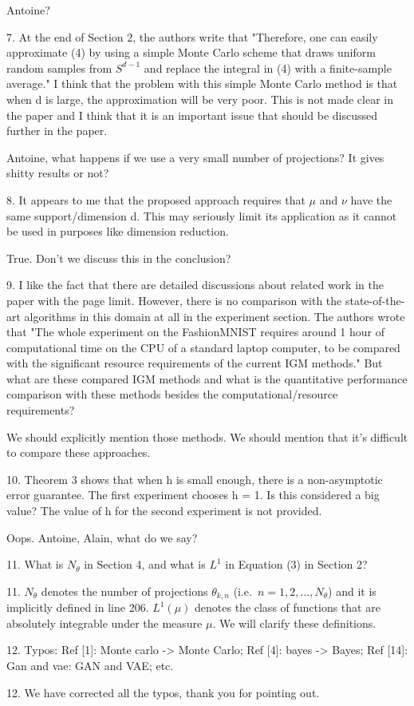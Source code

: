 \documentclass{article}
\newcommand{\rev}[1]{{\color{red} #1}}
\newcommand{\umut}[1]{{\color{blue} #1}}
\begin{document}
\umut{Antoine?}

\rev{7. At the end of Section 2, the authors write that "Therefore, one can easily approximate (4) by using a simple Monte Carlo scheme that draws uniform random samples from $S^{d-1}$ and replace the integral in (4) with a finite-sample average." I think that the problem with this simple Monte Carlo method is that when d is large, the approximation will be very poor. This is not made clear in the paper and I think that it is an important issue that should be discussed further in the paper.} 

\umut{Antoine, what happens if we use a very small number of projections? It gives shitty results or not?}

\rev{8. It appears to me that the proposed approach requires that $\mu$ and $\nu$ have the same support/dimension d. This may seriously limit its application as it cannot be used in purposes like dimension reduction.} 

\umut{True. Don't we discuss this in the conclusion?}

\rev{9. I like the fact that there are detailed discussions about related work in the paper with the page limit. However, there is no comparison with the state-of-the-art algorithms in this domain at all in the experiment section. The authors wrote that "The whole experiment on the FashionMNIST requires around 1 hour of computational time on the CPU of a standard laptop computer, to be compared with the significant resource requirements of the current IGM methods." But what are these compared IGM methods and what is the quantitative performance comparison with these methods besides the computational/resource requirements?} 

\umut{We should explicitly mention those methods. We should mention that it's difficult to compare these approaches.}

\rev{10. Theorem 3 shows that when h is small enough, there is a non-asymptotic error guarantee. The first experiment chooses h = 1. Is this considered a big value? The value of h for the second experiment is not provided.} 

\umut{Oops. Antoine, Alain, what do we say?}

\rev{11. What is $N_\theta$ in Section 4, and what is $L^1$ in Equation (3) in Section 2?} 

11. $N_\theta$ denotes the number of projections $\theta_{k,n}$ (i.e.\ $n = 1,2,\dots, N_\theta$) and it is implicitly defined in line 206. $L^1(\mu)$ denotes the class of functions that are absolutely integrable under the measure $\mu$. We will clarify these definitions.  

\rev{12. Typos: Ref [1]: Monte carlo -> Monte Carlo; Ref [4]: bayes -> Bayes; Ref [14]: Gan and vae: GAN and VAE; etc.}

12. We have corrected all the typos, thank you for pointing out. 
\end{document}
